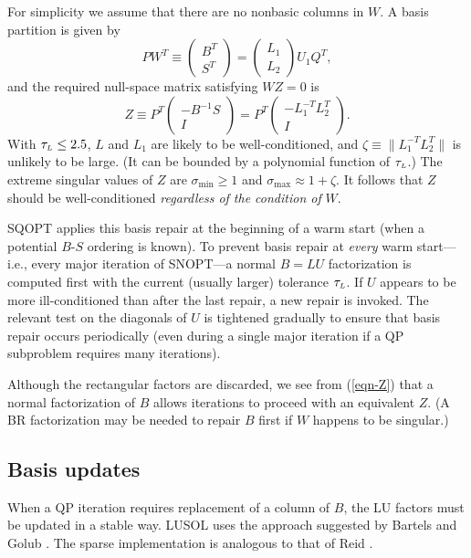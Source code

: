 \documentclass[draft,leqno,onefignum,onetabnum]{siamltex}
\def\norm#1{\|#1\|}
\def\Lmax{\hbox{$\tau_{\scriptscriptstyle L}$}}  %
\def\LUSOL {{\small LUSOL}}
\def\SNOPT {{\small SNOPT}}
\def\SQOPT {{\small SQOPT}}
\newcommand{\pmat}[1]{\begin{pmatrix}#1\end{pmatrix}}
\begin{document}
For simplicity we assume that there are no nonbasic columns in $W$.
A basis partition is given by
$$
   P W^T \equiv \pmat{B^T \\ S^T} = \pmat{L_1 \\ L_2} U_1 Q^T,
$$
and the required null-space matrix satisfying $WZ = 0$ is
\begin{equation}                                \label{eqn-Z}
   Z \equiv P^T \pmat{-  B^{-1}   S   \\ I}
          = P^T \pmat{-L_1^{-T} L_2^T \\ I}.
\end{equation}
With $\Lmax \le 2.5$,  $L$ and $L_1$ are likely to be well-conditioned,
and $\zeta \equiv \norm{L_1^{-T} L_2^T}$ is unlikely to be large.
(It can be bounded by a polynomial function of $\Lmax$.)
The extreme singular values of $Z$ are
$\sigma_{\min} \ge 1$ and $\sigma_{\max} \approx 1 + \zeta$.
It follows that $Z$ should be well-conditioned
\emph{regardless of the condition of} $W$.

\SQOPT{} applies this basis repair at the beginning of a warm start
(when a potential $B$-$S$ ordering is known).
To prevent basis repair at \emph{every} warm start---i.e., every major
iteration of \SNOPT---a normal $B = LU$ factorization is computed first
with the current (usually larger) tolerance $\Lmax$.
If $U$ appears to be more ill-conditioned than after the last repair,
a new repair is invoked.  The relevant test on the diagonals of $U$
is tightened gradually to ensure that basis repair occurs periodically
(even during a single major iteration if a QP subproblem requires
many iterations).

Although the rectangular factors are discarded,
we see from (\ref{eqn-Z}) that a normal factorization of $B$ allows
iterations to proceed with an equivalent $Z$.
(A BR factorization may be needed to repair $B$ first if
$W$ happens to be singular.)



\subsection{Basis updates} \label{sec-Bupdates}

When a QP iteration requires replacement of a column of $B$,
the LU factors must be updated in a stable way.
\LUSOL{} uses the approach suggested by Bartels and Golub \cite{Bar71}.
The sparse implementation is analogous to that of Reid \cite{Reid76,Rei82}.
\end{document}
